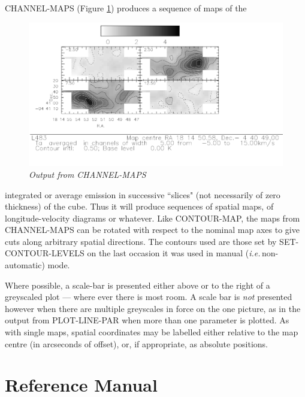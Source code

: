 \documentclass[11pt,twoside]{report}
\newcommand{\ie}{{\it i.e.\,}}
\begin{document}
CHANNEL-MAPS (Figure \ref{CHANMAP}) produces a sequence of maps of the
\begin{figure}[htbp]
\begin{center}
\includegraphics[scale=0.8]{chann-map}
\protect\parbox{5.5in}
{\caption[CHANMAP]
{\sl
Output from CHANNEL-MAPS
\label{CHANMAP}
}
}
\end{center}
\end{figure}
integrated or average emission in successive ``slices" (not necessarily of zero
thickness) of the cube. Thus it will produce sequences of spatial maps, of
longitude-velocity diagrams  or whatever.
Like CONTOUR-MAP, the maps from CHANNEL-MAPS can be rotated with respect to the
nominal map axes to give cuts along arbitrary spatial directions. The contours
used are those set by SET-CONTOUR-LEVELS on the last occasion it was used in
manual (\ie non-automatic) mode.

Where possible, a scale-bar is presented either
above or to the right of a greyscaled plot --- where ever there is most room.
A scale bar is {\em not} presented however when there are multiple greyscales
in force on the one picture, as in the output from PLOT-LINE-PAR when more
than one parameter is plotted.
As with single maps, spatial coordinates may be labelled either relative to
the map centre (in arcseconds of offset), or, if appropriate, as absolute
positions.

\newpage
\part{Reference Manual}
\end{document}
